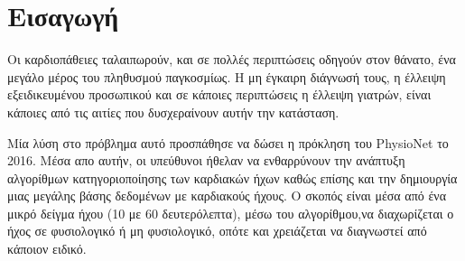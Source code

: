 \section{Εισαγωγή}
Οι καρδιοπάθειες ταλαιπωρούν, και σε πολλές περιπτώσεις οδηγούν στον θάνατο, ένα
μεγάλο μέρος του πληθυσμού παγκοσμίως. Η μη έγκαιρη διάγνωσή τους, η έλλειψη
εξειδικευμένου προσωπικού και σε κάποιες περιπτώσεις η έλλειψη γιατρών, είναι
κάποιες από τις αιτίες που δυσχεραίνουν αυτήν την κατάσταση.

Μία λύση στο πρόβλημα αυτό προσπάθησε να δώσει η πρόκληση του PhysioNet το
2016. Μέσα απο αυτήν, οι υπεύθυνοι ήθελαν να ενθαρρύνουν την ανάπτυξη αλγορίθμων
κατηγοριοποίησης των καρδιακών ήχων καθώς επίσης και την δημιουργία μιας μεγάλης
βάσης δεδομένων με καρδιακούς ήχους. Ο σκοπός είναι μέσα από ένα μικρό δείγμα
ήχου (10 με 60 δευτερόλεπτα), μέσω του αλγορίθμου,να διαχωρίζεται ο ήχος σε
φυσιολογικό ή μη φυσιολογικό, οπότε και χρειάζεται να διαγνωστεί από κάποιον
ειδικό.
